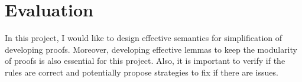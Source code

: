 \documentclass[]{article}
\begin{document}
\section{Evaluation}
In this project, I would like to design effective semantics for simplification of developing proofs. 
Moreover, developing effective lemmas to keep the modularity of proofs is also essential for this 
project. Also, it is important to verify if the rules are correct and potentially propose strategies 
to fix if there are issues.

\end{document}
